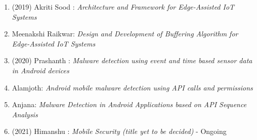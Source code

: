 \begin{enumerate}
\item	(2019) Akriti Sood	: 	\textit{Architecture and Framework for Edge-Assisted IoT Systems}
\item		Meenakshi Raikwar: 	\textit{Design and Development of Buffering Algorithm for Edge-Assisted IoT Systems}

	

\item	(2020) Prashanth	: 	\textit{Malware detection using event and time based sensor data in Android devices}
\item		Alamjoth: 	\textit{Android mobile malware detection using API calls and permissions}
\item		Anjana: 	\textit{Malware Detection in Android Applications based on API Sequence Analysis}

\item	(2021) Himanshu	: 	\textit{Mobile Security (title yet to be decided)}	-	Ongoing

\end{enumerate}